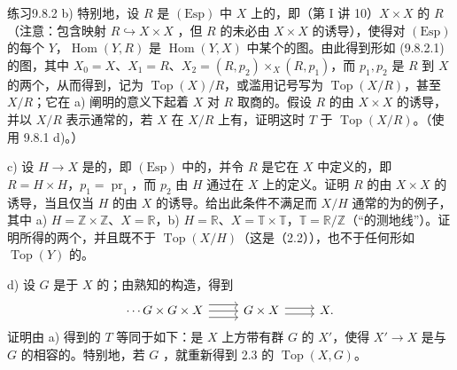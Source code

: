 \begin{SGAresult}{练习}{9.8.2}
b) 特别地，设 $R$ 是 $(\mathrm{Esp})$ 中 $X$ 上的，即（第 I 讲 10）$X\times X$ 的 $R$（注意：包含映射 $R\hookrightarrow X\times X$ ，但 $R$ 的未必由 $X\times X$ 的诱导），使得对 $(\mathrm{Esp})$ 的每个 $Y$，$\operatorname{Hom}(Y,R)$ 是 $\operatorname{Hom}(Y,X)$ 中某个的图。由此得到形如 (9.8.2.1) 的图，其中 $X_0=X$、$X_1=R$、$X_2=(R,p_2)\times_X(R,p_1)$，而 $p_1,p_2$ 是 $R$ 到 $X$ 的两个，从而得到，记为 $\operatorname{Top}(X)/R$，或滥用记号写为 $\operatorname{Top}(X/R)$，甚至 $X/R$；它在 a) 阐明的意义下起着 $X$ 对 $R$ 取商的。假设 $R$ 的由 $X\times X$ 的诱导，并以 $X/R$ 表示通常的，若 $X$ 在 $X/R$ 上有，证明这时 $T$ 于 $\operatorname{Top}(X/R)$。（使用 9.8.1 d)。）

c) 设 $H\to X$ 是的，即 $(\mathrm{Esp})$ 中的，并令 $R$ 是它在 $X$ 中定义的，即 $R=H\times H$，$p_1=\operatorname{pr}_1$，而 $p_2$ 由 $H$ 通过在 $X$ 上的定义。证明 $R$ 的由 $X\times X$ 的诱导，当且仅当 $H$ 的由 $X$ 的诱导。给出此条件不满足而 $X/H$ 通常的为的例子，其中 a) $H=\mathbb Z\times\mathbb Z$、$X=\mathbb R$，b) $H=\mathbb R$、$X=\mathbb T\times\mathbb T$，$\mathbb T=\mathbb R/\mathbb Z$（“的测地线”）。证明所得的两个，并且既不于 $\operatorname{Top}(X/H)$（这是（2.2）），也不于任何形如 $\operatorname{Top}(Y)$ 的。

d) 设 $G$ 是于 $X$ 的；由熟知的构造，得到
\[
\begin{tikzcd}
\cdots G\times G\times X\arrow[r,shift left=1.2ex]\arrow[r]\arrow[r,shift right=1.2ex]&G\times X\arrow[r,shift left]\arrow[r,shift right]&X.
\end{tikzcd}
\]
证明由 a) 得到的 $T$ 等同于如下：是 $X$ 上方带有群 $G$ 的 $X'$，使得 $X'\to X$ 是与 $G$ 的相容的。特别地，若 $G$ ，就重新得到 2.3 的 $\operatorname{Top}(X,G)$。


\end{SGAresult}
